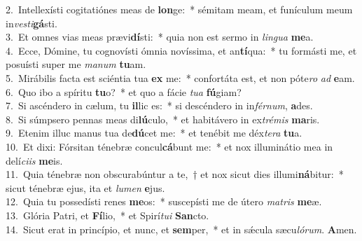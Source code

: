 {2.~}Intellexísti cogitatiónes meas de \textbf{lon}ge:~* sémitam meam, et funículum meum in\textit{ve}\textit{sti}\textbf{gá}sti.\\
{3.~}Et omnes vias meas prævi\textbf{dí}sti:~* quia non est sermo in \textit{lin}\textit{gua} \textbf{me}a.\\
{4.~}Ecce, Dómine, tu cognovísti ómnia novíssima, et an\textbf{tí}qua:~* tu formásti me, et posuísti super me \textit{ma}\textit{num} \textbf{tu}am.\\
{5.~}Mirábilis facta est sciéntia tua \textbf{ex} me:~* confortáta est, et non póte\textit{ro} \textit{ad} \textbf{e}am.\\
{6.~}Quo ibo a spíritu \textbf{tu}o?~* et quo a fácie \textit{tu}\textit{a} \textbf{fú}giam?\\
{7.~}Si ascéndero in cælum, tu \textbf{il}lic es:~* si descéndero in in\textit{fér}\textit{num}, \textbf{a}des.\\
{8.~}Si súmpsero pennas meas di\textbf{lú}culo,~* et habitávero in ex\textit{tré}\textit{mis} \textbf{ma}ris.\\
{9.~}Etenim illuc manus tua de\textbf{dú}cet me:~* et tenébit me déx\textit{te}\textit{ra} \textbf{tu}a.\\
{10.~}Et dixi: Fórsitan ténebræ concul\textbf{cá}bunt me:~* et nox illuminátio mea in delí\textit{ci}\textit{is} \textbf{me}is.\\
{11.~}Quia ténebræ non obscurabúntur a te,~† et nox sicut dies illumi\textbf{ná}bitur:~* sicut ténebræ ejus, ita et \textit{lu}\textit{men} \textbf{e}jus.\\
{12.~}Quia tu possedísti renes \textbf{me}os:~* suscepísti me de útero \textit{ma}\textit{tris} \textbf{me}æ.\\
{13.~}Glória Patri, et \textbf{Fí}lio,~* et Spirí\textit{tu}\textit{i} \textbf{San}cto.\\
{14.~}Sicut erat in princípio, et nunc, et \textbf{sem}per,~* et in sǽcula sæcu\textit{ló}\textit{rum}. \textbf{A}men.\\
